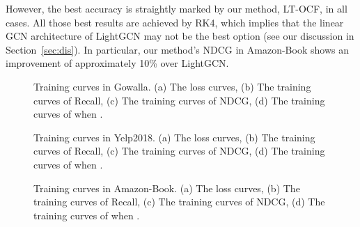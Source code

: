 \documentclass[sigconf]{acmart}
\begin{document}
However, the best accuracy is straightly marked by our method, LT-OCF, in all cases. All those best results are achieved by RK4, which implies that the linear GCN architecture of LightGCN may not be the best option (see our discussion in Section~\ref{sec:dis}). In particular, our method's NDCG in Amazon-Book shows an improvement of approximately 10\% over LightGCN.

\begin{figure}[t]
\centering
{}

\caption{Training curves in Gowalla. (a) The loss curves, (b) The training curves of Recall, (c) The training curves of NDCG, (d) The training curves of  when .} \label{fig:time1}
\end{figure}

\begin{figure}[t]
\centering
{}
\caption{Training curves in Yelp2018. (a) The loss curves, (b) The training curves of Recall, (c) The training curves of NDCG, (d) The training curves of  when .} \label{fig:time2}
\end{figure}

\begin{figure}[t]
\centering
{}
\caption{Training curves in Amazon-Book. (a) The loss curves, (b) The training curves of Recall, (c) The training curves of NDCG, (d) The training curves of  when .} \label{fig:time3}
\end{figure}
\end{document}
